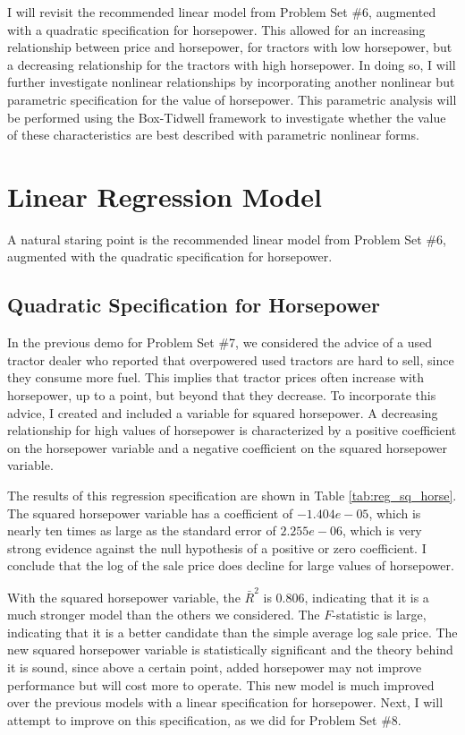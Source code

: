 \documentclass[11pt]{paper}
\begin{document}
I will revisit the recommended linear model
from Problem Set \#6, 
augmented with a quadratic specification for horsepower.
This allowed for an increasing relationship 
between price and horsepower, 
for tractors with low horsepower, 
but a decreasing relationship for the tractors with high horsepower. 
%
In doing so, I will further investigate nonlinear relationships
by incorporating another nonlinear but parametric specification
for the value of horsepower. 
This parametric analysis will be performed
using the Box-Tidwell framework
to investigate whether the value of these characteristics
are best described with parametric nonlinear forms. 

\clearpage
\section{Linear Regression Model}

A natural staring point is the recommended linear model
from Problem Set \#6, augmented with 
the quadratic specification for horsepower. 

\subsection{Quadratic Specification for Horsepower}

In the previous demo for Problem Set \#7, 
we considered the advice of
a used tractor dealer who reported that overpowered used tractors are hard to sell, since they consume more fuel. 
This implies that tractor prices often increase with horsepower, up to a point, but beyond that they decrease. 
To incorporate this advice, I created and included a variable for squared horsepower. 
A decreasing relationship for high values of horsepower
is characterized by 
a positive coefficient on the horsepower variable and
a negative coefficient on the squared horsepower variable. 

% 

% 
The results of this regression specification are shown in 
Table \ref{tab:reg_sq_horse}. 
%
The squared horsepower variable has a coefficient of $-1.404e-05$, which is nearly ten times as large as the standard error of $2.255e-06$, which is very strong evidence against the null hypothesis of a positive or zero coefficient. 
I conclude that the log of the sale price does decline for large values of horsepower. 


With the squared horsepower variable, the $\bar{R}^2$ is $0.806$, indicating that it is a much stronger model than the others we considered. 
The $F$-statistic is large, indicating that it is a better candidate than the simple average log sale price. 
The new squared horsepower variable is statistically significant and the theory behind it is sound, since above a certain point, added horsepower may not improve performance but will cost more to operate. 
This new model is much improved over the previous models with a linear specification for horsepower.
Next, I will attempt to improve on this specification, 
as we did for Problem Set \#8. 
\end{document}
